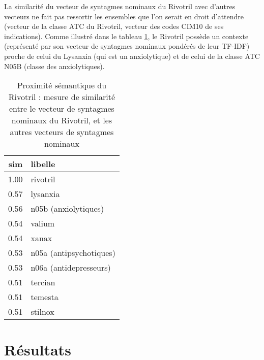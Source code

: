 \documentclass[a4paper, 12pt, openany, oneside, abstract=on]{article} %
\begin{document}
La similarité du vecteur de syntagmes nominaux du Rivotril avec d'autres vecteurs ne fait pas ressortir les ensembles que l'on serait en droit d'attendre (vecteur de la classe ATC du Rivotril, vecteur des codes CIM10 de ses indications). Comme illustré dans le tableau \ref{table:SimRivotril}, le Rivotril possède un contexte (représenté par son vecteur de syntagmes nominaux pondérés de leur TF-IDF) proche de celui du Lysanxia (qui est un anxiolytique) et de celui de la classe ATC N05B (classe des anxiolytiques).
\begin{table}[H]
\centering
\begin{tabular}{rl}
  \hline
sim & libelle \\ 
  \hline
  1.00 & rivotril \\ 
  0.57 & lysanxia \\ 
  0.56 & n05b (anxiolytiques) \\ 
  0.54 & valium \\ 
  0.54 & xanax \\ 
  0.53 & n05a (antipsychotiques) \\ 
  0.53 & n06a (antidepresseurs) \\ 
  0.51 & tercian \\ 
  0.51 & temesta \\ 
  0.51 & stilnox \\ 
   \hline
\end{tabular}
\caption{Proximité sémantique du Rivotril : mesure de similarité entre le vecteur de syntagmes nominaux du Rivotril, et les autres vecteurs de syntagmes nominaux}
\label{table:SimRivotril}
\end{table}

\section{Résultats}
\end{document}
